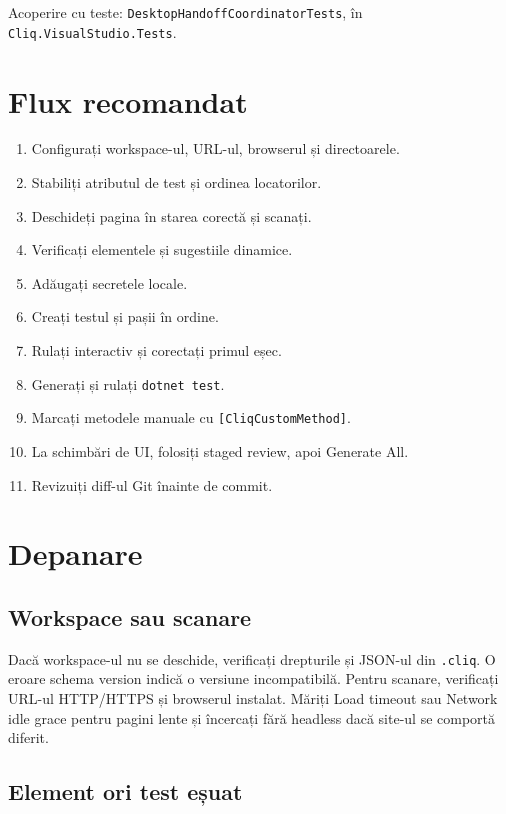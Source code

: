 \documentclass[12pt,a4paper]{report}
\newcommand{\File}[1]{\nolinkurl{#1}}
\begin{document}
Acoperire cu teste: \File{DesktopHandoffCoordinatorTests}, în \File{Cliq.VisualStudio.Tests}.

\chapter{Flux recomandat}

\begin{enumerate}
  \item Configurați workspace-ul, URL-ul, browserul și directoarele.
  \item Stabiliți atributul de test și ordinea locatorilor.
  \item Deschideți pagina în starea corectă și scanați.
  \item Verificați elementele și sugestiile dinamice.
  \item Adăugați secretele locale.
  \item Creați testul și pașii în ordine.
  \item Rulați interactiv și corectați primul eșec.
  \item Generați și rulați \File{dotnet test}.
  \item Marcați metodele manuale cu \File{[CliqCustomMethod]}.
  \item La schimbări de UI, folosiți staged review, apoi Generate All.
  \item Revizuiți diff-ul Git înainte de commit.
\end{enumerate}

\chapter{Depanare}

\section{Workspace sau scanare}

Dacă workspace-ul nu se deschide, verificați drepturile și JSON-ul din \File{.cliq}. O eroare schema version indică o versiune incompatibilă. Pentru scanare, verificați URL-ul HTTP/HTTPS și browserul instalat. Măriți Load timeout sau Network idle grace pentru pagini lente și încercați fără headless dacă site-ul se comportă diferit.

\section{Element ori test eșuat}
\end{document}
